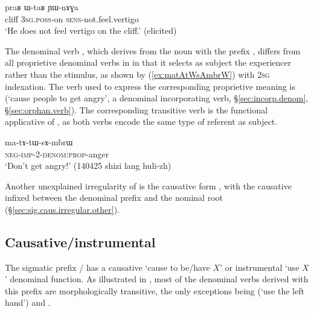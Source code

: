 \begin{exe}
\ex \label{ex:YWnAGA}
 \gll  praʁ ɯ-taʁ ɲɯ-nɤɣa \\
 cliff \textsc{3sg}.\textsc{poss}-on \textsc{sens}-not.feel.vertigo \\
 \glt `He does not feel vertigo on the cliff.' (elicited) 
  \end{exe}

The denominal verb , which derives from the noun  with the prefix , differs from all proprietive denominal verbs in  in that it selects as subject the experiencer rather than the stimulus, as shown by (\ref{ex:matAtWsAmbrW}) with \textsc{2sg} indexation. The verb used to express the corresponding proprietive meaning is  (`cause people to get angry', a denominal incorporating verb, §\ref{sec:incorp.denom}, §\ref{sec:orphan.verb}). The corresponding transitive verb   is the functional applicative of , as both verbs encode the same type of referent as subject.

\begin{exe}
\ex \label{ex:matAtWsAmbrW}
\gll ma-tɤ-tɯ-sɤ-mbrɯ \\
\textsc{neg}-\textsc{imp}-2-\textsc{denom}:\textsc{prop}-anger \\
\glt `Don't get angry!' (140425 shizi lang huli-zh)
\end{exe}

Another unexplained irregularity of  is the causative form , with the causative  infixed between the denominal prefix and the nominal root (§\ref{sec:sig.caus.irregular.other}).
 

\subsection{Causative/instrumental  } \label{sec:denom.sW.caus.instr}
The sigmatic prefix / has a causative `cause to be/have $X$' or instrumental `use $X$' denominal function. As illustrated in , most of the denominal verbs derived with this prefix are morphologically transitive, the only exceptions being  (`use the left hand') and .

